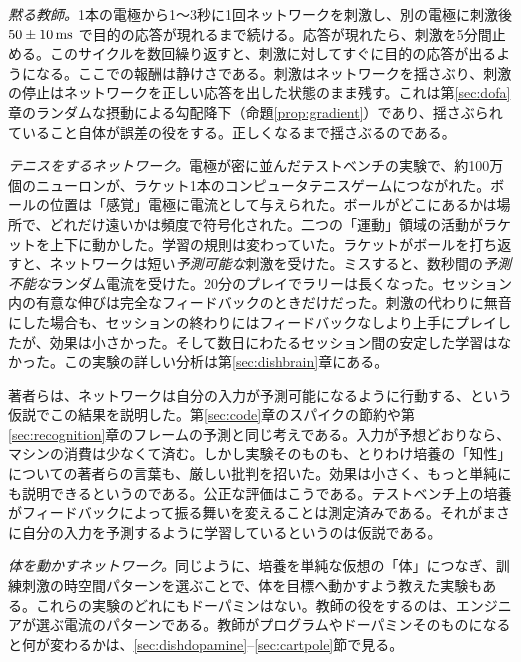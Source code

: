 \emph{黙る教師。}1本の電極から1〜3秒に1回ネットワークを刺激し、別の電極に刺激後 $50\pm10\,\text{ms}$ で目的の応答が現れるまで続ける。応答が現れたら、刺激を5分間止める。このサイクルを数回繰り返すと、刺激に対してすぐに目的の応答が出るようになる\cite{Shahaf2001}。ここでの報酬は静けさである。刺激はネットワークを揺さぶり、刺激の停止はネットワークを正しい応答を出した状態のまま残す。これは第\ref{sec:dofa}章のランダムな摂動による勾配降下（命題\ref{prop:gradient}）であり、揺さぶられていること自体が誤差の役をする。正しくなるまで揺さぶるのである。

\emph{テニスをするネットワーク。}電極が密に並んだテストベンチの実験で、約100万個のニューロンが、ラケット1本のコンピュータテニスゲームにつながれた\cite{Kagan2022}。ボールの位置は「感覚」電極に電流として与えられた。ボールがどこにあるかは場所で、どれだけ遠いかは頻度で符号化された。二つの「運動」領域の活動がラケットを上下に動かした。学習の規則は変わっていた。ラケットがボールを打ち返すと、ネットワークは短い\emph{予測可能な}刺激を受けた。ミスすると、数秒間の\emph{予測不能な}ランダム電流を受けた。20分のプレイでラリーは長くなった。セッション内の有意な伸びは完全なフィードバックのときだけだった。刺激の代わりに無音にした場合も、セッションの終わりにはフィードバックなしより上手にプレイしたが、効果は小さかった。そして数日にわたるセッション間の安定した学習はなかった。この実験の詳しい分析は第\ref{sec:dishbrain}章にある。

著者らは、ネットワークは自分の入力が予測可能になるように行動する、という仮説でこの結果を説明した\cite{Friston2010}。第\ref{sec:code}章のスパイクの節約や第\ref{sec:recognition}章のフレームの予測と同じ考えである。入力が予想どおりなら、マシンの消費は少なくて済む。しかし実験そのものも、とりわけ培養の「知性」についての著者らの言葉も、厳しい批判を招いた。効果は小さく、もっと単純にも説明できるというのである\cite{Balci2023}。公正な評価はこうである。テストベンチ上の培養がフィードバックによって振る舞いを変えることは測定済みである。それがまさに自分の入力を予測するように学習しているというのは仮説である。

\emph{体を動かすネットワーク。}同じように、培養を単純な仮想の「体」につなぎ、訓練刺激の時空間パターンを選ぶことで、体を目標へ動かすよう教えた実験もある\cite{Bakkum2008}。これらの実験のどれにもドーパミンはない。教師の役をするのは、エンジニアが選ぶ電流のパターンである。教師がプログラムやドーパミンそのものになると何が変わるかは、\ref{sec:dishdopamine}--\ref{sec:cartpole}節で見る。

